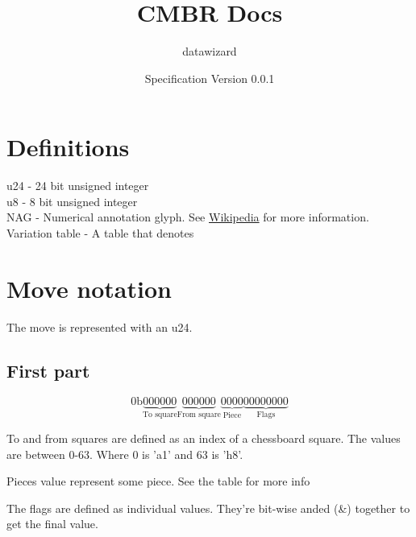 \documentclass{article}
\title{CMBR Docs}
\author{datawizard}
\date{Specification Version 0.0.1}
\begin{document}
\maketitle

\section{Definitions}
u24 - 24 bit unsigned integer \\
u8  - 8  bit unsigned integer \\
NAG - Numerical annotation glyph. See \href{https://w.wiki/AWUT}{Wikipedia} for more information. \\
Variation table - A table that denotes  \\

\section{Move notation}
The move is represented with an u24.
\subsection{First part}
\begin{equation}
    0\text{b}\underbrace{000000}_\text{To square} \underbrace{000000}_\text{From square}
    \underbrace{0000}_\text{Piece}\underbrace{00000000}_\text{Flags}
\end{equation}

To and from squares are defined as an index of a chessboard square. The values are between 0-63. Where 0 is 'a1' and 63 is 'h8'.
\par Pieces value represent some piece. See the table for more info
\par The flags are defined as individual values. They're bit-wise anded (\&) together to get the final value.
\end{document}
